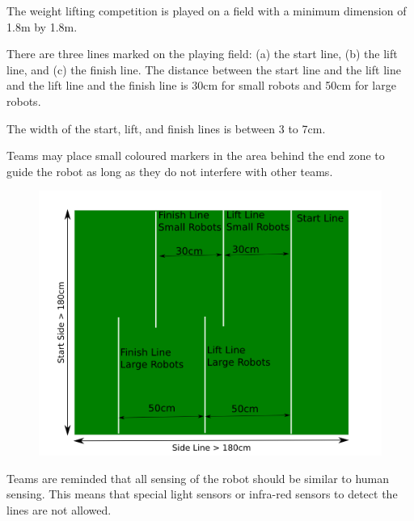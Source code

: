 \documentclass[12pt]{hurocup}
\begin{document}
\begin{lawlist}[WL]
\item The weight lifting competition is played on a field with a
minimum dimension of 1.8m by 1.8m.

\item There are three lines marked on the playing field: (a) the start line,
 (b) the lift line, and (c) the finish line. The distance between the
 start line and the lift line and the lift line and the finish line is
 30cm for small robots and 50cm for large robots.

\item The width of the start, lift, and finish lines is between 3 to 7cm.

\item Teams may place small coloured markers in the area behind the
  end zone to guide the robot as long as they do not interfere with
  other teams.

\begin{figure}
  \begin{center}
    \includegraphics[width=0.70\linewidth]{Figures/weight-lifting}
  \end{center}
\end{figure}

\end{lawlist}

\begin{decisions}

\item Teams are reminded that all sensing of the robot should be
  similar to human sensing. This means that special light sensors or
  infra-red sensors to detect the lines are not allowed.

\end{decisions}

\end{document}
